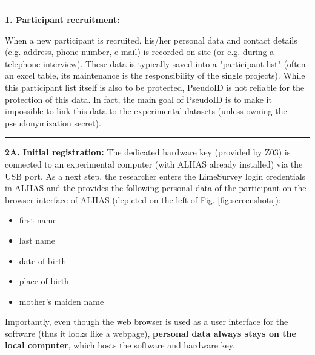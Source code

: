 \par\noindent\rule{\textwidth\color{pniblue}}{0.4pt}
\textbf{1. Participant recruitment:}
When a new participant is recruited, his/her personal data and contact details (e.g. address, phone number, e-mail) is recorded on-site (or e.g. during a telephone interview). These data is typically saved into a "participant list" (often an excel table, its maintenance is the responsibility of the single projects). While this participant list itself is also to be protected, PseudoID is not reliable for the protection of this data. In fact, the main goal of PseudoID is to make it impossible to link this data to the experimental datasets (unless owning the pseudonymization secret).


\par\noindent\rule{\textwidth\color{pniblue}}{0.4pt}
\textbf{2A. Initial registration:} The dedicated hardware key (provided by Z03) is connected to an experimental computer (with ALIIAS already installed) via the USB port. As a next step, the researcher enters the LimeSurvey login credentials in ALIIAS and the provides the following personal data of the participant on the browser interface of ALIIAS (depicted on the left of Fig. \ref{fig:screenshots}):
\begin{itemize}
    \item first name
    \item last name
    \item date of birth
    \item place of birth
    \item mother's maiden name
\end{itemize}

Importantly, even though the web browser is used as a user interface for the software (thus it looks like a webpage), \textbf{personal data always stays on the local computer}, which hosts the software and hardware key.


